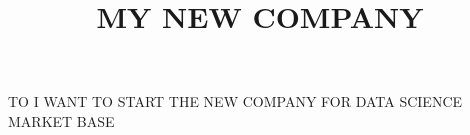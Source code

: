 \documentclass{article}
\begin{document}
\title{MY NEW COMPANY }
\maketitle
TO I WANT TO START THE NEW COMPANY FOR DATA SCIENCE MARKET BASE
\end{document}
